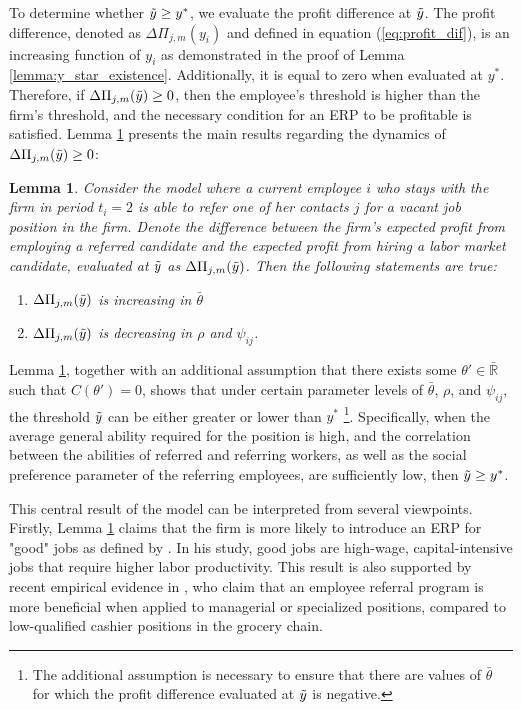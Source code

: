 \documentclass[12pt]{article}
\newtheorem{lemma}{Lemma}
\begin{document}
To determine whether $\Tilde{y} \geq y^*$, we evaluate the profit difference at $\Tilde{y}$. The profit difference, denoted as $\Delta \Pi_{j,m}(y_i)$ and defined in equation (\ref{eq:profit_dif}), is an increasing function of $y_i$ as demonstrated in the proof of Lemma \ref{lemma:y_star_existence}. Additionally, it is equal to zero when evaluated at $y^*$. Therefore, if $\Delta \Pi_{j,m}(\Tilde{y}) \geq 0$, then the employee's threshold is higher than the firm's threshold, and the necessary condition for an ERP to be profitable is satisfied. Lemma \ref{lemma:erp_existence} presents the main results regarding the dynamics of $\Delta \Pi_{j,m}(\Tilde{y}) \geq 0$:
\begin{lemma}\label{lemma:erp_existence}
    Consider the model where a current employee $i$ who stays with the firm in period $t_i = 2$ is able to refer one of her contacts $j$ for a vacant job position in the firm. Denote the difference between the firm’s expected profit from employing a referred candidate and the expected profit from hiring a labor market candidate, evaluated at $\Tilde{y}$ as $\Delta\Pi_{j,m}(\Tilde{y})$. Then the following statements are true:
    \begin{enumerate}[label={\roman*})]
        \item $\Delta\Pi_{j,m}(\Tilde{y})$ is increasing in $\bar{\theta}$
        \item $\Delta\Pi_{j,m}(\Tilde{y})$ is decreasing in $\rho$ and $\psi_{ij}$.
    \end{enumerate}
\end{lemma}

Lemma \ref{lemma:erp_existence}, together with an additional assumption that there exists some $\theta' \in \bar{\mathbb{R}}$ such that $C(\theta') = 0$, shows that under certain parameter levels of $\bar{\theta}$, $\rho$, and $\psi_{ij}$, the threshold $\Tilde{y}$ can be either greater or lower than $y^*$ \footnote{The additional assumption is necessary to ensure that there are values of $\bar{\theta}$ for which the profit difference evaluated at $\Tilde{y}$ is negative.}. Specifically, when the average general ability required for the position is high, and the correlation between the abilities of referred and referring workers, as well as the social preference parameter of the referring employees, are sufficiently low, then $\Tilde{y} \geq y^*$.

This central result of the model can be interpreted from several viewpoints. Firstly, Lemma \ref{lemma:erp_existence} claims that the firm is more likely to introduce an ERP for "good" jobs as defined by \cite{acemoglu2001good}. In his study, good jobs are high-wage, capital-intensive jobs that require higher labor productivity. This result is also supported by recent empirical evidence in \cite{friebel2023employee}, who claim that an employee referral program is more beneficial when applied to managerial or specialized positions, compared to low-qualified cashier positions in the grocery chain.
\end{document}
